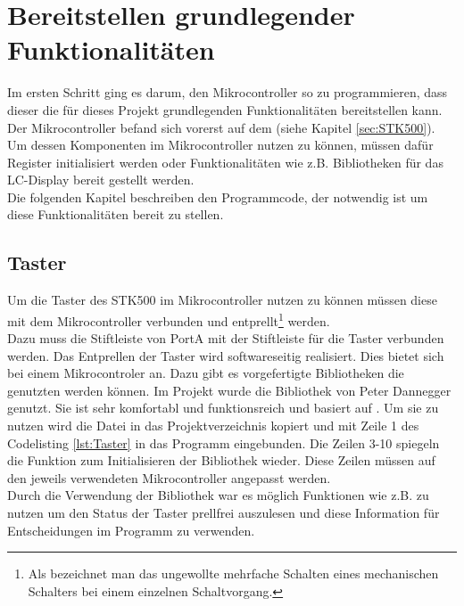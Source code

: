 \section{Bereitstellen grundlegender Funktionalitäten}
\label{sec:Erste_Schritte}
Im ersten Schritt ging es darum, den Mikrocontroller so zu programmieren, dass dieser die für dieses Projekt grundlegenden Funktionalitäten bereitstellen kann.\\
Der Mikrocontroller befand sich vorerst auf dem (siehe Kapitel \ref{sec:STK500}). Um dessen Komponenten im Mikrocontroller nutzen zu können, müssen dafür Register initialisiert werden oder Funktionalitäten wie z.B. Bibliotheken für das LC-Display bereit gestellt werden.\\
Die folgenden Kapitel beschreiben den Programmcode, der notwendig ist um diese Funktionalitäten bereit zu stellen.
\subsection{Taster}
\label{sec:Taster}
Um die Taster des STK500 im Mikrocontroller nutzen zu können müssen diese mit dem Mikrocontroller verbunden und entprellt\footnote{Als  bezeichnet man das ungewollte mehrfache Schalten eines mechanischen Schalters bei einem einzelnen Schaltvorgang.} werden.\\
Dazu muss die Stiftleiste von PortA mit der Stiftleiste für die Taster verbunden werden. Das Entprellen der Taster wird softwareseitig realisiert. Dies bietet sich bei einem Mikrocontroler an. Dazu gibt es vorgefertigte Bibliotheken die genutzten werden können. Im Projekt wurde die Bibliothek \cite{uC:Dannegger} von Peter Dannegger genutzt. Sie ist sehr komfortabl und funktionsreich und basiert auf . Um sie zu nutzen wird die Datei  in das Projektverzeichnis kopiert und mit Zeile 1 des Codelisting \ref{lst:Taster} in das Programm eingebunden. Die Zeilen 3-10 spiegeln die Funktion zum Initialisieren der Bibliothek wieder. Diese Zeilen müssen auf den jeweils verwendeten Mikrocontroller angepasst werden.\\
Durch die Verwendung der Bibliothek war es möglich Funktionen wie z.B.  zu nutzen um den Status der Taster prellfrei auszulesen und diese Information für Entscheidungen im Programm zu verwenden. 
\lstset{language=C, basicstyle=\footnotesize, showstringspaces=false, tabsize=8}


